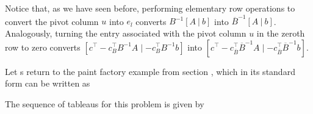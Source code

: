 Notice that, as we have seen before, performing elementary row operations to convert the pivot column $u$ into $e_l$ converts $B^{-1}[A ~|~ b]$ into $\overline{B}^{-1}[A ~|~ b]$. Analogously, turning the entry associated with the pivot column $u$ in the zeroth row to zero converts $[c^\top - c_B^\top B^{-1}A \mid -c_B^\top B^{-1}b]$ into $[c^\top - c_{\overline{B}}^\top \overline{B}^{-1}A \mid -c_{\overline{B}}^\top \overline{B}^{-1}b]$.

Let s return to the paint factory example from section \label{section_121}, which in its standard form can be written as
%

The sequence of tableaus for this problem is given by 

